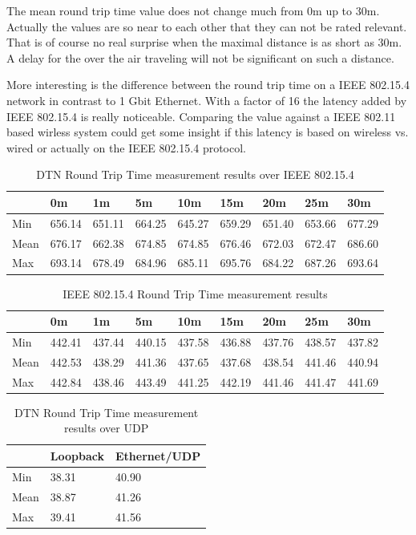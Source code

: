The mean round trip time value does not change much from 0m up to 30m. Actually
the values are so near to each other that they can not be rated relevant. That
is of course no real surprise when the maximal distance is as short as 30m. A
delay for the over the air traveling will not be significant on such a distance.

More interesting is the difference between the round trip time on a IEEE
802.15.4 network in contrast to 1 Gbit Ethernet. With a factor of 16 the latency
added by IEEE 802.15.4 is really noticeable. Comparing the value against a
IEEE 802.11 based wirless system could get some insight if this latency is based
on wireless vs. wired or actually on the IEEE 802.15.4 protocol.

\begin{table}
\begin{tabular}{lllllllll}
    & 0m & 1m & 5m & 10m & 15m & 20m & 25m & 30m \\
\hline
Min & 656.14 & 651.11 & 664.25 & 645.27 & 659.29 & 651.40 & 653.66 & 677.29 \\
Mean & 676.17 & 662.38 & 674.85 & 674.85 & 676.46 & 672.03 & 672.47 & 686.60 \\
Max & 693.14 & 678.49 & 684.96 & 685.11 & 695.76 & 684.22 & 687.26 & 693.64 \\
\end{tabular}
\caption{DTN Round Trip Time measurement results over IEEE 802.15.4}
\label{dtnrtt}
\end{table}

\begin{table}
\begin{tabular}{lllllllll}
    & 0m & 1m & 5m & 10m & 15m & 20m & 25m & 30m \\
\hline
Min & 442.41 & 437.44 & 440.15 & 437.58 & 436.88 & 437.76 & 438.57 & 437.82 \\
Mean & 442.53 & 438.29 & 441.36 & 437.65 & 437.68 & 438.54 & 441.46 & 440.94 \\
Max & 442.84 & 438.46 & 443.49 & 441.25 & 442.19 & 441.46 & 441.47 & 441.69 \\
\end{tabular}
\caption{IEEE 802.15.4 Round Trip Time measurement results}
\label{802154rtt}
\end{table}

\begin{table}
\begin{tabular}{lll}
    & Loopback & Ethernet/UDP \\
\hline
Min & 38.31 & 40.90 \\
Mean & 38.87 & 41.26 \\
Max & 39.41 & 41.56 \\
\end{tabular}
\caption{DTN Round Trip Time measurement results over UDP}
\label{dtnrtt2}
\end{table}
